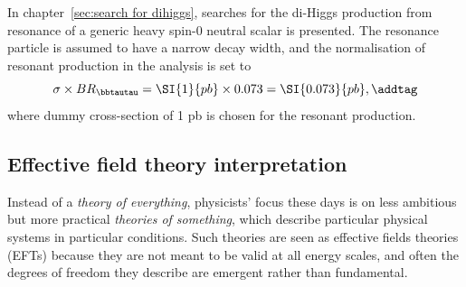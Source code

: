 In chapter~\ref{sec:search for dihiggs}, searches for the di-Higgs production from resonance 
of a generic heavy spin-0 neutral scalar is presented. The resonance particle is assumed to have a narrow
decay width, and the normalisation of resonant production in the analysis is set to 
\[
\sigma \times BR_{\bbtautau}  = \SI{1}{pb} \times 0.073  =  \SI{0.073}{pb},
\addtag \]
where dummy cross-section of 1 pb is chosen for the resonant production.

\subsection{Effective field theory interpretation}
Instead of a \textit{theory of everything}, 
physicists' focus these days is on less ambitious 
but more practical \textit{theories of something}, which describe particular physical
systems in particular conditions. Such theories are seen as effective fields theories (EFTs)
because they are not meant to be valid at all energy scales, and often the degrees of
freedom they describe are emergent rather than fundamental.

